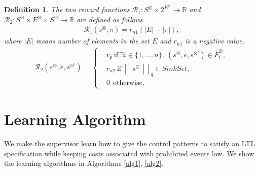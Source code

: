 \documentclass[letterpaper, 10 pt, conference]{ieeeconf}
\newtheorem{definition}{Definition}
\newcommand{\myspdq}{\ensuremath{[\![s^{\otimes \prime}]\!]}_q}
\begin{document}
\begin{definition}
  The two reward functions $\mathcal{R}_1 : S^{\otimes} \times 2^{E^{\otimes}} \rightarrow \mathbb{R}$ and $\mathcal{R}_2 : S^{\otimes} \times E^{\otimes} \times S^{\otimes} \rightarrow \mathbb{R}$ are defined as follows.
  \begin{align}
    \mathcal{R}_1 (s^{\otimes}, \pi) = r_{n1} (|E|-|\pi|),
  \end{align}
  where $|E|$ means number of elements in the set $E$ and $r_{n1}$ is a negative value.
  \begin{align}
    \mathcal{R}_2(s^{\otimes}, e, s^{\otimes \prime}) =
    \left\{
    \begin{aligned}
      &r_p \  \text{if}\ \exists i \in \! \{ 1, \ldots ,n \},\ (s^{\otimes}, e, s^{\otimes \prime}) \in \bar{F}^{\otimes}_i \!,\\
      &r_{n2} \ \text{if}\ \myspdq \in SinkSet,\\
      &0   \ \ \text{otherwise},
    \end{aligned}
    \right.
  \end{align}
\end{definition}
\section{Learning Algorithm}
We make the supervisor learn how to give the control patterns to satisfy an LTL specification while keeping costs associated with prohibited events low. We show the learning algorithms in Algorithms \ref{alg1}, \ref{alg2}.
\end{document}
